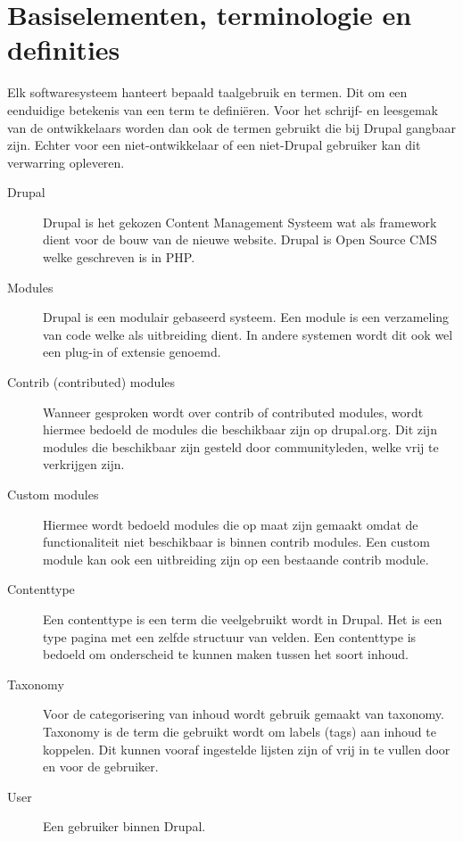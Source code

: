 \section{Basiselementen, terminologie en definities}

Elk softwaresysteem hanteert bepaald taalgebruik en termen. Dit om een eenduidige betekenis van een term te defini\"eren. Voor het schrijf- en leesgemak van de ontwikkelaars worden dan ook de termen gebruikt die bij Drupal gangbaar zijn. Echter voor een niet-ontwikkelaar of een niet-Drupal gebruiker kan dit verwarring opleveren. 

\begin{description}

\item[Drupal] Drupal is het gekozen Content Management Systeem wat als framework dient voor de bouw van de nieuwe website. Drupal is Open Source CMS welke geschreven is in PHP. 

\item[Modules] Drupal is een modulair gebaseerd systeem. Een module is een verzameling van code welke als uitbreiding dient. In andere systemen wordt dit ook wel een plug-in of extensie genoemd. 

\item[Contrib (contributed) modules] Wanneer gesproken wordt over contrib of contributed modules, wordt hiermee bedoeld de modules die beschikbaar zijn op drupal.org. Dit zijn modules die beschikbaar zijn gesteld door communityleden, welke vrij te verkrijgen zijn. 

\item[Custom modules] Hiermee wordt bedoeld modules die op maat zijn gemaakt omdat de functionaliteit niet beschikbaar is binnen contrib modules. Een custom module kan ook een uitbreiding zijn op een bestaande contrib module. 

\item[Contenttype] Een contenttype is een term die veelgebruikt wordt in Drupal. Het is een type pagina met een zelfde structuur van velden. Een contenttype is bedoeld om onderscheid te kunnen maken tussen het soort inhoud. 

\item[Taxonomy] Voor de categorisering van inhoud wordt gebruik gemaakt van taxonomy. Taxonomy is de term die gebruikt wordt om labels (tags) aan inhoud te koppelen. Dit kunnen vooraf ingestelde lijsten zijn of vrij in te vullen door en voor de gebruiker. 

\item[User] Een gebruiker binnen Drupal.


\end{description}

